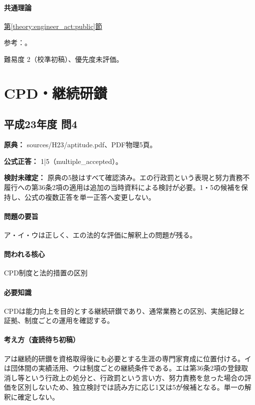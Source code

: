 \paragraph{共通理論} \hyperref[theory:engineer_act:public]{第\ref*{theory:engineer_act:public}節}

\par 参考：\cite{engineer_act_current,cpd_v3}。

\par 難易度 2（校準初稿）、優先度未評価。

\section{CPD・継続研鑚}

\subsection{平成23年度 問4}
\label{q:h23-reg-apt-04}

\noindent\textbf{原典：} sources/H23/aptitude.pdf、PDF物理5頁。

\textbf{公式正答：} 1|5（multiple\_accepted）。

\par\textbf{検討未確定：} 原典の5肢はすべて確認済み。エの行政罰という表現と努力責務不履行への第36条2項の適用は追加の当時資料による検討が必要。1・5の候補を保持し、公式の複数正答を単一正答へ変更しない。

\paragraph{問題の要旨} ア・イ・ウは正しく、エの法的な評価に解釈上の問題が残る。

\paragraph{問われる核心} CPD制度と法的措置の区別

\paragraph{必要知識} CPDは能力向上を目的とする継続研鑚であり、通常業務との区別、実施記録と証拠、制度ごとの運用を確認する。

\paragraph{考え方（査読待ち初稿）} アは継続的研鑚を資格取得後にも必要とする生涯の専門家育成に位置付ける。イは団体間の実績活用、ウは制度ごとの継続条件である。エは第36条2項の登録取消し等という行政上の処分と、行政罰という言い方、努力責務を怠った場合の評価を区別しないため、独立検討では読み方に応じ1又は5が候補となる。単一の解釈に確定しない。

